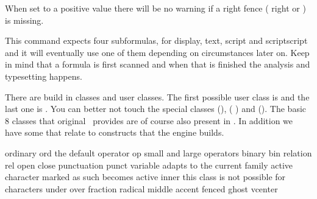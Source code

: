 When set to a positive value there will be no warning if a right fence (\prm
{right} or ) is missing.

\stopnewprimitive

\startoldprimitive[title={\prm {mathchoice}}]

This command expects four subformulas, for display, text, script and scriptscript
and it will eventually use one of them depending on circumstances later on. Keep
in mind that a formula is first scanned and when that is finished the analysis
and typesetting happens.

\stopoldprimitive

\startnewprimitive[title={\prm {mathclass}}]

There are build in classes and user classes. The first possible user class is
 and the last one is
. You can better not touch
the special classes  (\number \mathallcode),  (\number
\mathbegincode) and  (\number \mathendcode). The basic 8 classes that
original \TEX\ provides are of course also present in \LUAMETATEX. In addition we
have some that relate to constructs that the engine builds.

\starttabulate[|l|l|T|l|]
\FL
\NC ordinary        \NC ord    \NC \the\mathordinarycode    \NC the default \NC \NR
\NC operator        \NC op     \NC \the\mathoperatorcode    \NC small and large operators \NC \NR
\NC binary          \NC bin    \NC \the\mathbinarycode      \NC \NC \NR
\NC relation        \NC rel    \NC \the\mathrelationcode    \NC \NC \NR
\NC open            \NC        \NC \the\mathopencode        \NC \NC \NR
\NC close           \NC        \NC \the\mathclosecode       \NC \NC \NR
\NC punctuation     \NC punct  \NC \the\mathpunctuationcode \NC \NC \NR
\NC variable        \NC        \NC \the\mathvariablecode    \NC adapts to the current family \NC \NR
\NC active          \NC        \NC \the\mathactivecode      \NC character marked as such becomes active \NC \NR
\NC inner           \NC        \NC \the\mathinnercode       \NC this class is not possible for characters \NC \NR
\ML
\NC under           \NC        \NC \the\mathundercode       \NC \NC \NR
\NC over            \NC        \NC \the\mathovercode        \NC \NC \NR
\NC fraction        \NC        \NC \the\mathfractioncode    \NC \NC \NR
\NC radical         \NC        \NC \the\mathradicalcode     \NC \NC \NR
\NC middle          \NC        \NC \the\mathmiddlecode      \NC \NC \NR
\NC accent          \NC        \NC \the\mathaccentcode      \NC \NC \NR
\NC fenced          \NC        \NC \the\mathfencedcode      \NC \NC \NR
\NC ghost           \NC        \NC \the\mathghostcode       \NC \NC \NR
\NC vcenter         \NC        \NC \the\mathvcentercode     \NC \NC \NR
\LL
\stoptabulate

